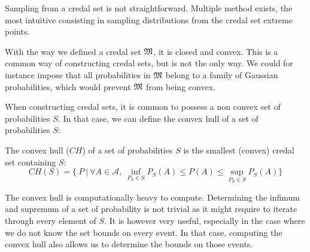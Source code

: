 \begin{remark}
    Sampling from a credal set is not straightforward. Multiple method exists, the most intuitive consisting in sampling distributions from the credal set extreme points.
\end{remark}

\begin{remark}
    With the way we defined a credal set ${\mathfrak{M}}$, it is closed and convex. This is a common way of constructing credal sets, but is not the only way. We could for instance impose that all probabilities in ${\mathfrak{M}}$ belong to a family of Gaussian probabilities, which would prevent ${\mathfrak{M}}$ from being convex.
\end{remark}

When constructing credal sets, it is common to possess a non convex set of probabilities $S$. In that case, we can define the convex hull of a set of probabilities $S$:
\begin{definition}\label{def:convex_hull}
    The convex hull ($CH$) of a set of probabilities $S$ is the smallest (convex) credal set containing $S$:
    \begin{equation}
        CH(S) = \{~P~|~\forall A\in\mathcal{A}, ~\inf_{P_S\in S}P_S(A)\leqslant P(A) \leqslant \sup_{P_S\in S}P_S(A)\}
    \end{equation}
\end{definition}

\begin{remark}
    The convex hull is computationally heavy to compute. Determining the infimum and supremum of a set of probability is not trivial as it might require to iterate through every element of $S$. It is however very useful, especially in the case where we do not know the set bounds on every event. In that case, computing the convex hull also allows us to determine the bounds on those events.
\end{remark}

